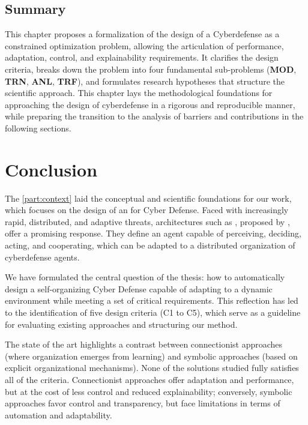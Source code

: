 \section{Summary}
\noindent
This chapter proposes a formalization of the design of a Cyberdefense  as a constrained optimization problem, allowing the articulation of performance, adaptation, control, and explainability requirements. It clarifies the design criteria, breaks down the problem into four fundamental sub-problems (\textbf{MOD}, \textbf{TRN}, \textbf{ANL}, \textbf{TRF}), and formulates research hypotheses that structure the scientific approach.
%
This chapter lays the methodological foundations for approaching the design of cyberdefense  in a rigorous and reproducible manner, while preparing the transition to the analysis of barriers and contributions in the following sections.

\clearpage
\thispagestyle{empty}
\null
\newpage

\chapter*{Conclusion}

The \autoref{part:context} laid the conceptual and scientific foundations for our work, which focuses on the design of an  for Cyber Defense. Faced with increasingly rapid, distributed, and adaptive threats, architectures such as , proposed by , offer a promising response. They define an agent capable of perceiving, deciding, acting, and cooperating, which can be adapted to a distributed organization of cyberdefense agents.

We have formulated the central question of the thesis: how to automatically design a self-organizing Cyber Defense  capable of adapting to a dynamic environment while meeting a set of critical requirements. This reflection has led to the identification of five design criteria (C1 to C5), which serve as a guideline for evaluating existing approaches and structuring our method.

The state of the art highlights a contrast between connectionist approaches (where organization emerges from learning) and symbolic approaches (based on explicit organizational mechanisms). None of the solutions studied fully satisfies all of the criteria. Connectionist approaches offer adaptation and performance, but at the cost of less control and reduced explainability; conversely, symbolic approaches favor control and transparency, but face limitations in terms of automation and adaptability.

